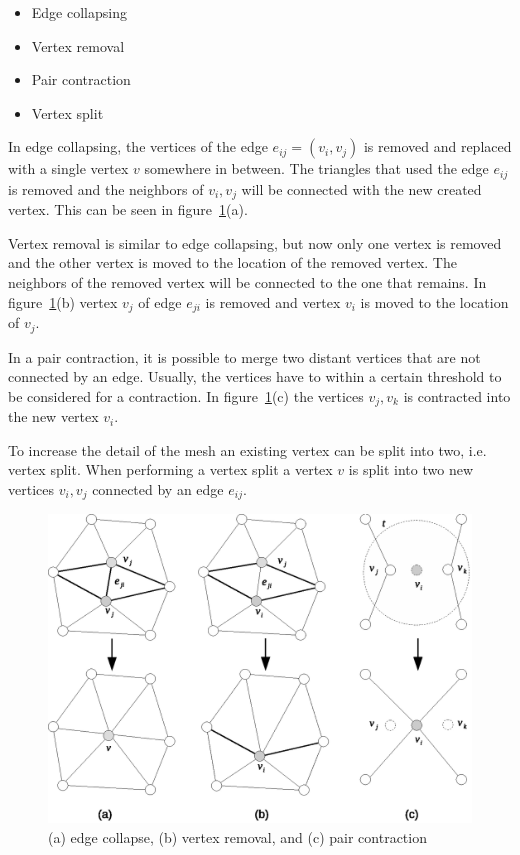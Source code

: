 \begin{itemize}
\item Edge collapsing
\item Vertex removal
\item Pair contraction
\item Vertex split
\end{itemize}

In edge collapsing, the vertices of the edge $e_{ij} = (v_i, v_j)$ is removed and replaced with a single vertex $v$ somewhere in between. The triangles that used the edge $e_{ij}$ is removed and the neighbors of $v_i, v_j$ will be connected with the new created vertex. This can be seen in figure~\ref{fig:mesh_transformations}(a).

Vertex removal is similar to edge collapsing, but now only one vertex is removed and the other vertex is moved to the location of the removed vertex. The neighbors of the removed vertex will be connected to the one that remains. In figure~\ref{fig:mesh_transformations}(b) vertex $v_j$ of edge $e_{ji}$ is removed and vertex $v_i$ is moved to the location of $v_j$.

In a pair contraction, it is possible to merge two distant vertices that are not connected by an edge. Usually, the vertices have to within a certain threshold to be considered for a contraction. In figure~\ref{fig:mesh_transformations}(c) the vertices $v_j, v_k$ is contracted into the new vertex $v_i$. 

To increase the detail of the mesh an existing vertex can be split into two, i.e. vertex split. When performing a vertex split a vertex $v$ is split into two new vertices $v_i, v_j$ connected by an edge $e_{ij}$. 

\begin{figure}[h]
    \centering
    \includegraphics[width=\textwidth]{figures/mesh_transformations.eps}
    \caption{(a) edge collapse, (b) vertex removal, and (c) pair contraction}
    \label{fig:mesh_transformations}
\end{figure}

